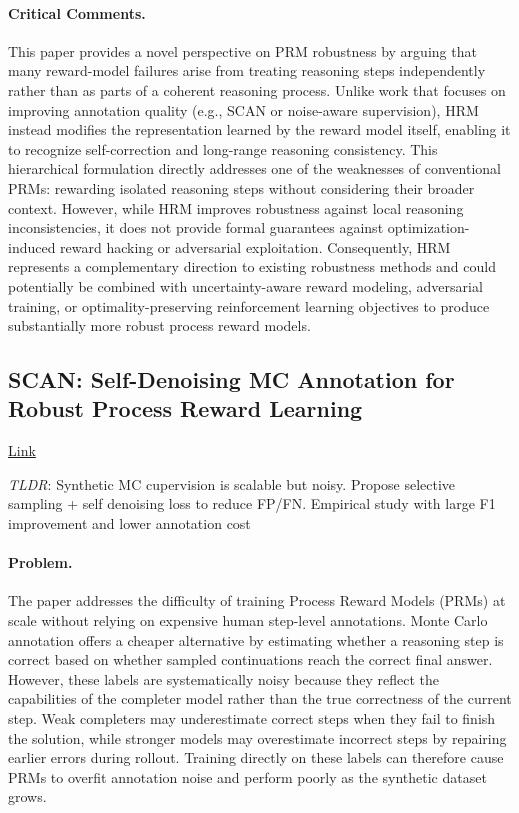 \documentclass[11pt]{article}
\begin{document}
\paragraph{Critical Comments.}
This paper provides a novel perspective on PRM robustness by arguing that many reward-model failures arise from treating reasoning steps independently rather than as parts of a coherent reasoning process. Unlike work that focuses on improving annotation quality (e.g., SCAN or noise-aware supervision), HRM instead modifies the representation learned by the reward model itself, enabling it to recognize self-correction and long-range reasoning consistency. This hierarchical formulation directly addresses one of the weaknesses of conventional PRMs: rewarding isolated reasoning steps without considering their broader context. However, while HRM improves robustness against local reasoning inconsistencies, it does not provide formal guarantees against optimization-induced reward hacking or adversarial exploitation. Consequently, HRM represents a complementary direction to existing robustness methods and could potentially be combined with uncertainty-aware reward modeling, adversarial training, or optimality-preserving reinforcement learning objectives to produce substantially more robust process reward models.  

\subsection{SCAN: Self-Denoising MC Annotation for Robust Process Reward Learning}

\href{https://arxiv.org/abs/2509.16548}{Link}

\emph{TLDR}: Synthetic MC cupervision is scalable but noisy. Propose selective sampling + self denoising loss to reduce FP/FN. Empirical study with large F1 improvement and lower annotation cost

\paragraph{Problem.}
The paper addresses the difficulty of training Process Reward Models (PRMs) at scale without relying on expensive human step-level annotations. Monte Carlo annotation offers a cheaper alternative by estimating whether a reasoning step is correct based on whether sampled continuations reach the correct final answer. However, these labels are systematically noisy because they reflect the capabilities of the completer model rather than the true correctness of the current step. Weak completers may underestimate correct steps when they fail to finish the solution, while stronger models may overestimate incorrect steps by repairing earlier errors during rollout. Training directly on these labels can therefore cause PRMs to overfit annotation noise and perform poorly as the synthetic dataset grows.
\end{document}
